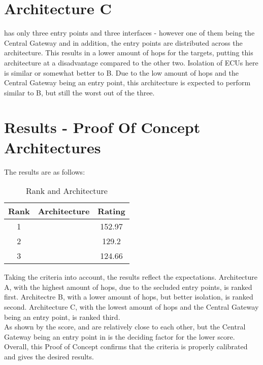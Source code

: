 \section{Architecture C}
\label{sec:archc}

 has only three entry points and three interfaces - however one of them being the Central Gateway and 
in addition, the entry points are distributed across the architecture. 
This results in a lower amount of hops for the targets, putting this architecture at a disadvantage compared to the other two.
Isolation of ECUs here is similar or somewhat better to B.
Due to the low amount of hops and the Central Gateway being an entry point, this architecture is expected to perform 
similar to B, but still the worst out of the three.


\section{Results - Proof Of Concept Architectures}

The results are as follows:

\begin{table}[h]
    \label{table:survey}
    \centering
    \caption{Rank and Architecture}
    \begin{tabular}{ |c|c|c| } 
    \hline
    Rank & Architecture & Rating\\
    \hline
    1 & \nameref{fig:architectureA} & 152.97\\ 
    2 & \nameref{fig:architectureB} & 129.2\\
    3 & \nameref{fig:architectureC} & 124.66\\
    \hline
    \end{tabular}
\end{table}

Taking the criteria into account, the results reflect the expectations.
Architecture A, with the highest amount of hops, due to the secluded entry points, is ranked first.
Architectre B, with a lower amount of hops, but better isolation, is ranked second.
Architecture C, with the lowest amount of hops and the Central Gateway being an entry point, is ranked third.\\

As shown by the score,  and  are relatively close to each other,
but the Central Gateway being an entry point in  is the deciding factor for the lower score.\\

Overall, this Proof of Concept confirms that the criteria is properly calibrated and gives the desired results.
